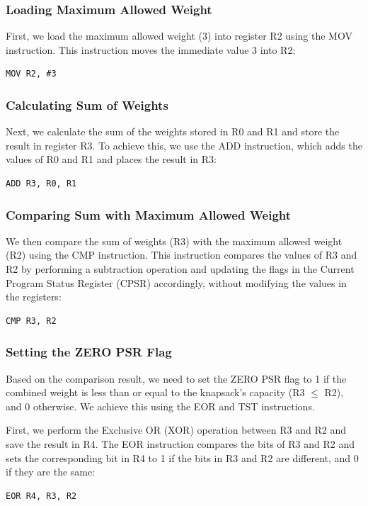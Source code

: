 \subsubsection{Loading Maximum Allowed Weight}
First, we load the maximum allowed weight (3) into register R2 using the MOV instruction. This instruction moves the immediate value 3 into R2:
\begin{verbatim}
MOV R2, #3
\end{verbatim}

\subsubsection{Calculating Sum of Weights}
Next, we calculate the sum of the weights stored in R0 and R1 and store the result in register R3. To achieve this, we use the ADD instruction, which adds the values of R0 and R1 and places the result in R3:
\begin{verbatim}
ADD R3, R0, R1
\end{verbatim}

\subsubsection{Comparing Sum with Maximum Allowed Weight}
We then compare the sum of weights (R3) with the maximum allowed weight (R2) using the CMP instruction. This instruction compares the values of R3 and R2 by performing a subtraction operation and updating the flags in the Current Program Status Register (CPSR) accordingly, without modifying the values in the registers:
\begin{verbatim}
CMP R3, R2
\end{verbatim}

\subsubsection{Setting the ZERO PSR Flag}
Based on the comparison result, we need to set the ZERO PSR flag to 1 if the combined weight is less than or equal to the knapsack's capacity (R3 $\leq$ R2), and 0 otherwise. We achieve this using the EOR and TST instructions.

First, we perform the Exclusive OR (XOR) operation between R3 and R2 and save the result in R4. The EOR instruction compares the bits of R3 and R2 and sets the corresponding bit in R4 to 1 if the bits in R3 and R2 are different, and 0 if they are the same:
\begin{verbatim}
EOR R4, R3, R2
\end{verbatim}

